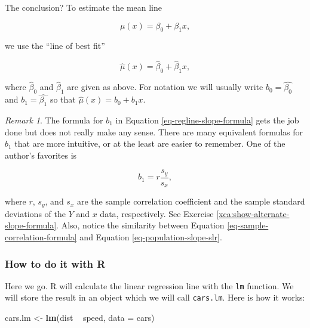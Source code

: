 \documentclass[]{book}
\newenvironment{Shaded}{\begin{snugshade}}{\end{snugshade}}
\newcommand{\KeywordTok}[1]{\textcolor[rgb]{0.13,0.29,0.53}{\textbf{{#1}}}}
\newcommand{\DataTypeTok}[1]{\textcolor[rgb]{0.13,0.29,0.53}{{#1}}}
\newcommand{\StringTok}[1]{\textcolor[rgb]{0.31,0.60,0.02}{{#1}}}
\newcommand{\NormalTok}[1]{{#1}}
\numberwithin{equation}{chapter}
\numberwithin{figure}{chapter}
\theoremstyle{plain}
\theoremstyle{definition}
\theoremstyle{remark}
\newtheorem{rem}[thm]{Remark}
\theoremstyle{definition}
\theoremstyle{definition}
\theoremstyle{remark}
\begin{document}
The conclusion? To estimate the mean line

\begin{equation}
\mu(x) = \beta_{0} + \beta_{1}x,
\end{equation}

we use the ``line of best fit''

\begin{equation}
\hat{\mu}(x) = \hat{\beta}_{0} + \hat{\beta}_{1}x,
\end{equation}

where \(\hat{\beta}_{0}\) and \(\hat{\beta}_{1}\) are given as above.
For notation we will usually write \(b_{0} = \hat{\beta_{0}}\) and
\(b_{1}=\hat{\beta_{1}}\) so that \(\hat{\mu}(x) = b_{0} + b_{1}x\).

\bigskip

\begin{rem}
The formula for \(b_{1}\) in Equation \eqref{eq-regline-slope-formula}
gets the job done but does not really make any sense. There are many
equivalent formulas for \(b_{1}\) that are more intuitive, or at the
least are easier to remember. One of the author's favorites is

\begin{equation}
\label{eq-sample-correlation-formula} 
b_{1} = r\frac{s_{y}}{s_{x}},
\end{equation}

where \(r\), \(s_{y}\), and \(s_{x}\) are the sample correlation
coefficient and the sample standard deviations of the \(Y\) and \(x\)
data, respectively. See Exercise \ref{xca:show-alternate-slope-formula}.
Also, notice the similarity between Equation
\eqref{eq-sample-correlation-formula} and Equation
\eqref{eq-population-slope-slr}.
\end{rem}

\subsubsection{How to do it with R}\label{how-to-do-it-with-r-24}

Here we go. R will calculate the linear regression line with the
\texttt{lm} function. We will store the result in an object which we
will call \texttt{cars.lm}. Here is how it works:

\begin{Shaded}
\begin{Highlighting}[]
\NormalTok{cars.lm <-}\StringTok{ }\KeywordTok{lm}\NormalTok{(dist ~}\StringTok{ }\NormalTok{speed, }\DataTypeTok{data =} \NormalTok{cars)}
\end{Highlighting}
\end{Shaded}
\end{document}
